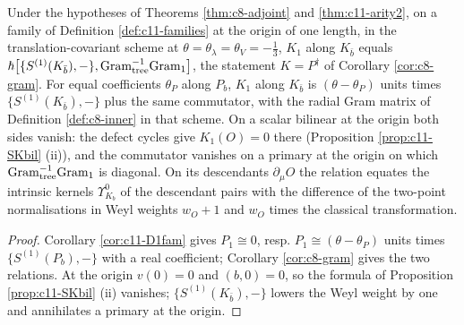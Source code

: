 \begin{corollary}
\label{cor:c11-K}
Under the hypotheses of Theorems \ref{thm:c8-adjoint} and \ref{thm:c11-arity2}, on a family of Definition \ref{def:c11-families} at the origin of one length, in the translation-covariant scheme at $\theta=\theta_\lambda=\theta_V=-\tfrac13$, $K_1$ along $K_{\bar b}$ equals $\hbar\big[\{S^{(1)}(K_{\bar b}),-\},\mathrm{Gram}_{\rm tree}^{-1}\mathrm{Gram}_{\rm 1}\big]$, the statement $K=P^\dagger$ of Corollary \ref{cor:c8-gram}. For equal coefficients $\theta_P$ along $P_b$, $K_1$ along $K_{\bar b}$ is $(\theta-\theta_P)$ units times $\{S^{(1)}(K_{\bar b}),-\}$ plus the same commutator, with the radial Gram matrix of Definition \ref{def:c8-inner} in that scheme. On a scalar bilinear at the origin both sides vanish: the defect cycles give $K_1(O)=0$ there (Proposition \ref{prop:c11-SKbil} (ii)), and the commutator vanishes on a primary at the origin on which $\mathrm{Gram}_{\rm tree}^{-1}\mathrm{Gram}_{\rm 1}$ is diagonal. On its descendants $\partial_\mu O$ the relation equates the intrinsic kernels $\Upsilon^0_{K_b}$ of the descendant pairs with the difference of the two-point normalisations in Weyl weights $w_O+1$ and $w_O$ times the classical transformation.
\end{corollary}

\begin{proof}
Corollary \ref{cor:c11-D1fam} gives $P_1\cong0$, resp. $P_1\cong(\theta-\theta_P)$ units times $\{S^{(1)}(P_b),-\}$ with a real coefficient; Corollary \ref{cor:c8-gram} gives the two relations. At the origin $v(0)=0$ and $(b,0)=0$, so the formula of Proposition \ref{prop:c11-SKbil} (ii) vanishes; $\{S^{(1)}(K_{\bar b}),-\}$ lowers the Weyl weight by one and annihilates a primary at the origin.
\end{proof}

